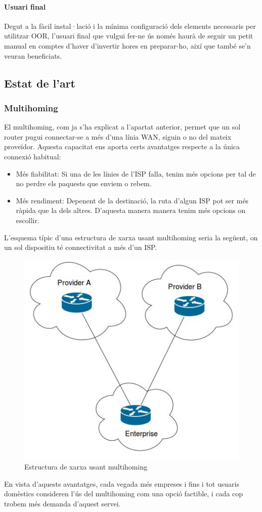 \documentclass[11pt]{article}
\begin{document}
\paragraph{Usuari final}
Degut a la fàcil instal·lació i la mínima configuració dels elements necessaris per utilitzar OOR, l’usuari final que vulgui fer-ne ús només haurà de seguir un petit manual en comptes d’haver d’invertir hores en preparar-ho, així que també se’n veuran beneficiats.
\newpage
\subsection{Estat de l'art}
\subsubsection{Multihoming}
El multihoming, com ja s’ha explicat a l’apartat anterior, permet que un sol router pugui connectar-se a més d’una línia WAN, siguin o no del mateix proveïdor. Aquesta capacitat ens aporta certs avantatges respecte a la única connexió habitual:
\begin{itemize}
\item Més fiabilitat: Si una de les línies de l’ISP falla, tenim més opcions per tal de no perdre els paquests que enviem o rebem.
\item Més rendiment: Depenent de la destinació, la ruta d’algun ISP pot ser més ràpida que la dels altres. D’aquesta manera manera tenim més opcions on escollir. 
\end{itemize}
L’esquema típic d’una estructura de xarxa usant multihoming seria la següent, on un sol dispositiu té connectivitat a més d’un ISP.
\begin{figure}[h]
	\centering
	\includegraphics{multihoming}
	\caption{Estructura de xarxa usant multihoming}
\end{figure}
En vista d'aquests avantatges, cada vegada més empreses i fins i tot usuaris domèstics consideren l'ús del multihoming com una opció factible, i cada cop trobem més demanda d'aquest servei.
\end{document}
